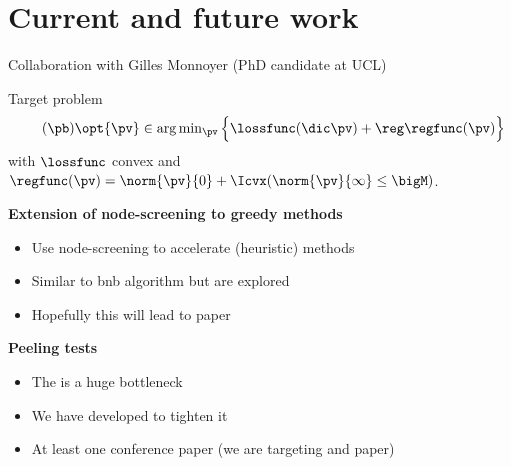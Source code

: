 \section{Current and future work}

\begin{frame}{Collaboration with Gilles Monnoyer (PhD candidate at UCL)}
  \pause
  \begin{block}{Target problem}
    \begin{equation}
      \label{prob:gille-sparse-problem}
      \tag{$\pb$}
      \opt{\pv} \in \textstyle\arg\min_{\pv} \Big\{ \lossfunc(\dic\pv) + \reg\regfunc(\pv) \Big\}
    \end{equation}
    with $\lossfunc$ convex and $\regfunc(\pv) = \norm{\pv}{0} + \Icvx(\norm{\pv}{\infty} \leq \bigM)$.
  \end{block}
  \pause
  \textbf{Extension of node-screening to greedy methods}
  \begin{itemize}
    \item Use node-screening to accelerate  (heuristic) methods
    \pause
    \item Similar to \gls{bnb} algorithm but  are explored
    \pause
    \item Hopefully this will lead to  paper
  \end{itemize}
  \pause
  \textbf{Peeling tests}
  \begin{itemize}
    \item The  is a huge bottleneck
    \pause
    \item We have developed  to tighten it
    \pause
    \item At least one conference paper (we are targeting  and  paper)
  \end{itemize}
\end{frame}

